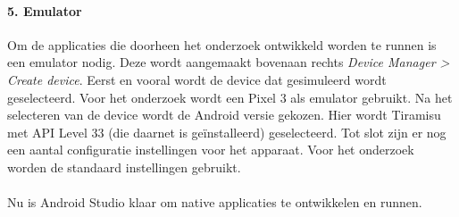 \paragraph{5. Emulator}
Om de applicaties die doorheen het onderzoek ontwikkeld worden te runnen is een emulator nodig. 
Deze wordt aangemaakt bovenaan rechts \textit{Device Manager > Create device}. 
Eerst en vooral wordt de device dat gesimuleerd wordt geselecteerd. Voor het onderzoek 
wordt een Pixel 3 als emulator gebruikt. Na het selecteren van de device wordt de Android versie gekozen. 
Hier wordt Tiramisu met API Level 33 (die daarnet is geïnstalleerd) geselecteerd. 
Tot slot zijn er nog een aantal configuratie instellingen voor het apparaat. Voor het onderzoek worden 
de standaard instellingen gebruikt.
\\\\
Nu is Android Studio klaar om native applicaties te ontwikkelen en runnen. 

